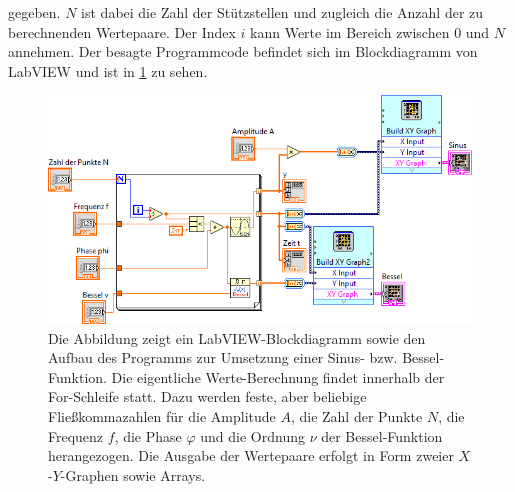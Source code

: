\documentclass[
a4paper,
12pt,
pagesize,
ngerman
]{scrartcl}
\begin{document}
	\noindent gegeben. $N$ ist dabei die Zahl der Stützstellen und zugleich die Anzahl der zu berechnenden Wertepaare. Der Index $i$ kann Werte im Bereich zwischen $0$ und $N$ annehmen. Der besagte Programmcode befindet sich im Blockdiagramm von LabVIEW und ist in \cref{sinusbesselprogrammcode} zu sehen. 
	
	\begin{figure}[H]
		\centering
		\includegraphics[width=1.0\textwidth]{EIRE2018Dateien/Tag1/sinusbessel-bilder/SinusBesseld}
		\caption{Die Abbildung zeigt ein LabVIEW-Blockdiagramm sowie den Aufbau des Programms zur Umsetzung einer Sinus- bzw. Bessel-Funktion. Die eigentliche Werte-Berechnung findet innerhalb der For-Schleife statt. Dazu werden feste, aber beliebige Fließkommazahlen für die Amplitude $A$, die Zahl der Punkte $N$, die Frequenz $f$, die Phase $\varphi$ und die Ordnung $\nu$ der Bessel-Funktion herangezogen. Die Ausgabe der Wertepaare erfolgt in Form zweier $X$-$Y$-Graphen sowie Arrays.}
		\label{sinusbesselprogrammcode}
	\end{figure}
\end{document}

